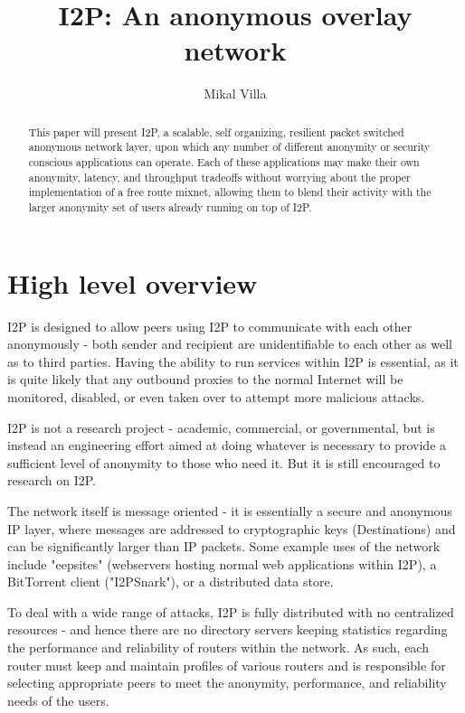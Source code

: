 \documentclass[a4paper,twocolumn,12pt]{article}
\title{I2P: An anonymous overlay network}
\author{Mikal Villa}
\begin{document}
\maketitle

\begin{abstract}\noindent
This paper will present I2P, a scalable, self organizing, resilient packet switched anonymous network layer, upon which any number of different anonymity or security conscious applications can operate. Each of these applications may make their own anonymity, latency, and throughput tradeoffs without worrying about the proper implementation of a free route mixnet, allowing them to blend their activity with the larger anonymity set of users already running on top of I2P.
\end{abstract}

\tableofcontents

\section{High level overview}

I2P is designed to allow peers using I2P to communicate with each other anonymously - both sender and recipient are unidentifiable to each other as well as to third parties. Having the ability to run services within I2P is essential, as it is quite likely that any outbound proxies to the normal Internet will be monitored, disabled, or even taken over to attempt more malicious attacks.

I2P is not a research project - academic, commercial, or governmental, but is instead an engineering effort aimed at doing whatever is necessary to provide a sufficient level of anonymity to those who need it. But it is still encouraged to research on I2P.

The network itself is message oriented - it is essentially a secure and anonymous IP layer, where messages are addressed to cryptographic keys (Destinations) and can be significantly larger than IP packets. Some example uses of the network include "eepsites" (webservers hosting normal web applications within I2P), a BitTorrent\cite{cohen08specification} client ("I2PSnark"), or a distributed data store.

To deal with a wide range of attacks, I2P is fully distributed with no centralized resources - and hence there are no directory servers keeping statistics regarding the performance and reliability of routers within the network. As such, each router must keep and maintain profiles of various routers and is responsible for selecting appropriate peers to meet the anonymity, performance, and reliability needs of the users.
\end{document}
